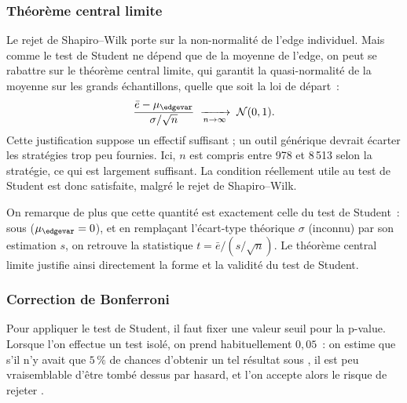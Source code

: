 \subsubsection*{Théorème central limite} %
Le rejet de Shapiro--Wilk porte sur la non-normalité de l'edge
individuel. Mais comme le test de Student ne dépend que de la
moyenne de l'edge, on peut se rabattre sur le théorème central
limite, qui garantit la quasi-normalité de la moyenne sur les grands
échantillons, quelle que soit la loi de départ~:
\[
  \frac{\bar e - \mu_{\edgevar}}{\sigma/\sqrt{n}}
  \;\xrightarrow[n \to \infty]{}\; \mathcal{N}(0,1) .
\]
Cette justification suppose un effectif suffisant ;
un outil générique devrait écarter les stratégies trop peu fournies.
Ici, \(n\) est compris entre 978 et 8\,513 selon la stratégie, ce qui est
largement suffisant.
La condition réellement utile au test de Student est donc satisfaite,
malgré le rejet de Shapiro--Wilk.

On remarque de plus que cette quantité est exactement celle du test de
Student~: sous \Hzero{} (\(\mu_{\edgevar} = 0\)), et en remplaçant l'écart-type
théorique \(\sigma\) (inconnu) par son estimation \(s\), on retrouve la
statistique \(t = \bar e / (s/\sqrt{n})\). Le théorème central limite
justifie ainsi directement la forme et la validité du test de Student.

\subsubsection*{Correction de Bonferroni} %
Pour appliquer le test de Student, il faut fixer une valeur seuil pour la
p-value. Lorsque l'on effectue un test isolé, on prend habituellement
\(0{,}05\)~: on estime que s'il n'y avait que \(5\,\%\) de chances
d'obtenir un tel résultat sous \Hzero{}, il est peu vraisemblable d'être
tombé dessus par hasard, et l'on accepte alors le risque de rejeter
\Hzero{}.

